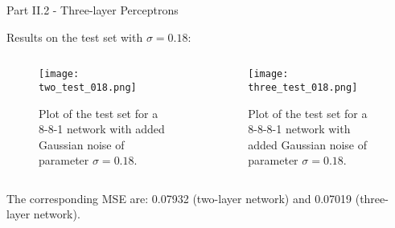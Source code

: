 \documentclass{beamer}
\begin{document}
\begin{frame}{Part II.2 - Three-layer Perceptrons}
    
    Results on the test set with $\sigma=0.18$:
    
  \begin{columns}[T]
    \begin{column}{.5\textwidth}
    \begin{block}{}
    \begin{figure} [H]
    \centering
    \texttt{[image: two\_test\_018.png]}
    \caption{Plot of the test set for a 8-8-1 network with added Gaussian noise of parameter $\sigma=0.18$.}
    \end{figure}
    \end{block}
    \end{column}
    \begin{column}{.5\textwidth}
    \begin{block}{}
    \begin{figure} [H]
    \centering
    \texttt{[image: three\_test\_018.png]}
    \caption{Plot of the test set for a 8-8-8-1 network with added Gaussian noise of parameter $\sigma=0.18$.}
    \end{figure}
    \end{block}
    \end{column}
  \end{columns}
    
  The corresponding MSE are: 0.07932 (two-layer network) and 0.07019 (three-layer network).
    
\end{frame}
\end{document}
